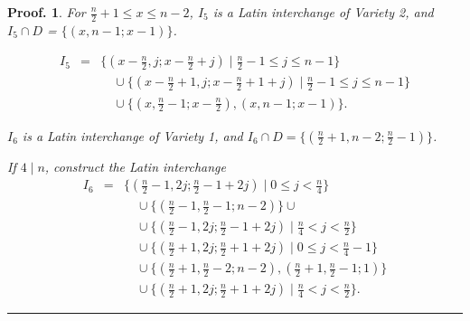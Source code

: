 \documentclass[12pt]{report}
\newtheorem{preproof}{{\bf Proof.}}
\newenvironment{proof}[1]{\begin{preproof}{\rm
               #1}\hfill{\rule[-0.5mm]{2mm}{2mm}}}{\end{preproof}}
\begin{document}
\begin{proof}
{\noindent For $\displaystyle{\frac{n}{2}} + 1 \leq x \leq n - 2$, 
$I_{5}$ is a Latin interchange of Variety 2, and 
$I_{5} \cap D$ = $\{(x, n-1; x-1)\}$.

\begin{eqnarray*}
I_{5} & = & \{ (x - \displaystyle{\frac{n}{2}}, j; x - \displaystyle{\frac{n}{2}} + j) \mid \displaystyle{\frac{n}{2}} - 1 \leq j \leq n-1 \} \\
&& \quad{}\cup \{ (x - \displaystyle{\frac{n}{2}} + 1, j; x- \displaystyle{\frac{n}{2}} + 1 + j) \mid \displaystyle{\frac{n}{2}} - 1 \leq j \leq n - 1 \} \\
&& \quad{}\cup \{ (x, \displaystyle{\frac{n}{2}} - 1; x - \displaystyle{\frac{n}{2}}), (x, n - 1; x - 1) \}. 
\end{eqnarray*}

\noindent $I_{6}$ is a Latin interchange of Variety 1, and $I_{6} \cap D = \{ (\displaystyle{\frac{n}{2}}+1,n-2;\displaystyle{\frac{n}{2}} - 1) \}$.

If $4 \mid n$, construct the Latin interchange
\begin{eqnarray*}
I_{6} & = & \{ (\displaystyle{\frac{n}{2}} - 1, 2j; \displaystyle{\frac{n}{2}} - 1 + 2j) \mid 0 \leq j < \displaystyle{\frac{n}{4}} \} \\
&& \quad{}\cup \{ (\displaystyle{\frac{n}{2}} - 1, \displaystyle{\frac{n}{2}} - 1; n - 2) \} \cup \\
&& \quad{}\cup \{ (\displaystyle{\frac{n}{2}} - 1, 2j; \displaystyle{\frac{n}{2}} - 1 + 2j) \mid \displaystyle{\frac{n}{4}} < j < \displaystyle{\frac{n}{2}} \} \\
&& \quad{}\cup \{ (\displaystyle{\frac{n}{2}} + 1, 2j; \displaystyle{\frac{n}{2}} + 1 + 2j) \mid 0 \leq j < \displaystyle{\frac{n}{4}}-1 \} \\
&& \quad{}\cup \{ (\displaystyle{\frac{n}{2}} + 1, \displaystyle{\frac{n}{2}} - 2; n - 2), (\displaystyle{\frac{n}{2}} + 1, \displaystyle{\frac{n}{2}} - 1; 1) \} \\
&& \quad{}\cup \{ (\displaystyle{\frac{n}{2}} + 1, 2j; \displaystyle{\frac{n}{2}} + 1 + 2j) \mid \displaystyle{\frac{n}{4}} < j < \displaystyle{\frac{n}{2}} \}.
\end{eqnarray*}

}
\end{proof}
\end{document}
